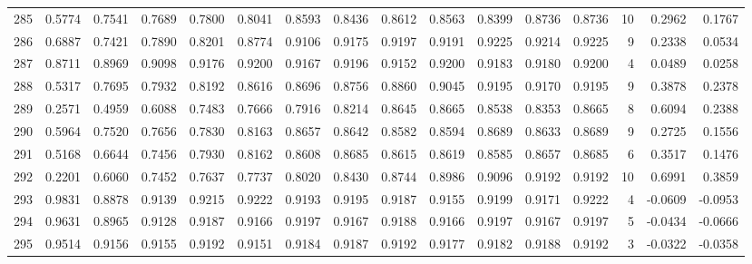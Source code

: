 \begin{tabular}{lrrrrrrrrrrrrrrr}
285 &      0.5774 &  0.7541 &  0.7689 &  0.7800 &  0.8041 &  0.8593 &  0.8436 &  0.8612 &  0.8563 &  0.8399 &   0.8736 &     0.8736 &     10 &                    0.2962 &                     0.1767 \\
286 &      0.6887 &  0.7421 &  0.7890 &  0.8201 &  0.8774 &  0.9106 &  0.9175 &  0.9197 &  0.9191 &  0.9225 &   0.9214 &     0.9225 &      9 &                    0.2338 &                     0.0534 \\
287 &      0.8711 &  0.8969 &  0.9098 &  0.9176 &  0.9200 &  0.9167 &  0.9196 &  0.9152 &  0.9200 &  0.9183 &   0.9180 &     0.9200 &      4 &                    0.0489 &                     0.0258 \\
288 &      0.5317 &  0.7695 &  0.7932 &  0.8192 &  0.8616 &  0.8696 &  0.8756 &  0.8860 &  0.9045 &  0.9195 &   0.9170 &     0.9195 &      9 &                    0.3878 &                     0.2378 \\
289 &      0.2571 &  0.4959 &  0.6088 &  0.7483 &  0.7666 &  0.7916 &  0.8214 &  0.8645 &  0.8665 &  0.8538 &   0.8353 &     0.8665 &      8 &                    0.6094 &                     0.2388 \\
290 &      0.5964 &  0.7520 &  0.7656 &  0.7830 &  0.8163 &  0.8657 &  0.8642 &  0.8582 &  0.8594 &  0.8689 &   0.8633 &     0.8689 &      9 &                    0.2725 &                     0.1556 \\
291 &      0.5168 &  0.6644 &  0.7456 &  0.7930 &  0.8162 &  0.8608 &  0.8685 &  0.8615 &  0.8619 &  0.8585 &   0.8657 &     0.8685 &      6 &                    0.3517 &                     0.1476 \\
292 &      0.2201 &  0.6060 &  0.7452 &  0.7637 &  0.7737 &  0.8020 &  0.8430 &  0.8744 &  0.8986 &  0.9096 &   0.9192 &     0.9192 &     10 &                    0.6991 &                     0.3859 \\
293 &      0.9831 &  0.8878 &  0.9139 &  0.9215 &  0.9222 &  0.9193 &  0.9195 &  0.9187 &  0.9155 &  0.9199 &   0.9171 &     0.9222 &      4 &                   -0.0609 &                    -0.0953 \\
294 &      0.9631 &  0.8965 &  0.9128 &  0.9187 &  0.9166 &  0.9197 &  0.9167 &  0.9188 &  0.9166 &  0.9197 &   0.9167 &     0.9197 &      5 &                   -0.0434 &                    -0.0666 \\
295 &      0.9514 &  0.9156 &  0.9155 &  0.9192 &  0.9151 &  0.9184 &  0.9187 &  0.9192 &  0.9177 &  0.9182 &   0.9188 &     0.9192 &      3 &                   -0.0322 &                    -0.0358 \\

\end{tabular}
